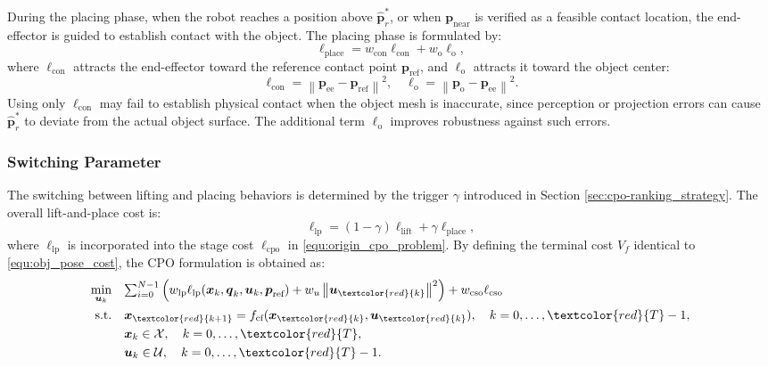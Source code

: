 During the placing phase, when the robot reaches a position above $\hat{\boldsymbol{p}}_r^*$, or when $\boldsymbol{p}_{\text{near}}$ is verified as a feasible contact location, the end-effector is guided to establish contact with the object. The placing phase is formulated by:
\begin{equation}
 \ell_{\text{place}} = w_{\text{con}} \ell_{\text{con}} + w_{\text{o}} \ell_{\text{o}},
\end{equation}
where $\ell_{\text{con}}$ attracts the end-effector toward the reference contact point $\boldsymbol{p}_{\text{ref}}$, and $\ell_{\text{o}}$ attracts it toward the object center:
\begin{equation}
 \ell_{\text{con}} = \left\|\boldsymbol{p}_{\text{ee}} - \boldsymbol{p}_{\text{ref}}\right\|^2,
 \quad
 \ell_{\text{o}} = \left \| \boldsymbol{p}_{\text{o}} - \boldsymbol{p}_{\text{ee}} \right \|^2.
\end{equation}
Using only $\ell_{\text{con}}$ may fail to establish physical contact when the object mesh is inaccurate, since perception or projection errors can cause $\hat{\boldsymbol{p}}_r^*$ to deviate from the actual object surface. The additional term $\ell_{\text{o}}$ improves robustness against such errors.

\subsubsection{Switching Parameter}

The switching between lifting and placing behaviors is determined by the trigger $\gamma$ introduced in Section \ref{sec:cpo-ranking_strategy}. The overall lift-and-place cost is:
\begin{equation}
 \ell_{\text{lp}} = (1-\gamma) \ell_{\text{lift}} + \gamma \ell_{\text{place}},
\end{equation}
where $\ell_{\text{lp}}$ is incorporated into the stage cost $\ell_{\text{cpo}}$ in \eqref{equ:origin_cpo_problem}. By defining the terminal cost $V_f$ identical to \eqref{equ:obj_pose_cost}, the CPO formulation is obtained as:
\begin{equation}\label{equ:cpo_formulation}
 \begin{aligned}
\min_{\boldsymbol{u}_k} \quad &
 {\textstyle \sum_{i=0}^{N-1}} \left (w_{\text{lp}} \ell_{\text{lp}}(\boldsymbol{x}_k, \boldsymbol{q}_k, \boldsymbol{u}_k, \boldsymbol{p}_{\text{ref}}) +w_{u}\left \| \boldsymbol{u}_{\textcolor{red}{k}} \right \|^2 \right ) +w_{\text{cso}}\ell_{\text{cso}} \\
\text{s.t.}\quad & \boldsymbol{x}_{\textcolor{red}{k+1}} = f_{\text{cf}}(\boldsymbol{x}_{\textcolor{red}{k}}, \boldsymbol{u}_{\textcolor{red}{k}}), \quad k=0,\dots,\textcolor{red}{T}-1, \\
& \boldsymbol{x}_k \in \mathcal{X}, \quad k=0,\dots,\textcolor{red}{T}, \\
& \boldsymbol{u}_k \in \mathcal{U}, \quad k=0,\dots,\textcolor{red}{T}-1.
\end{aligned}
\end{equation}

